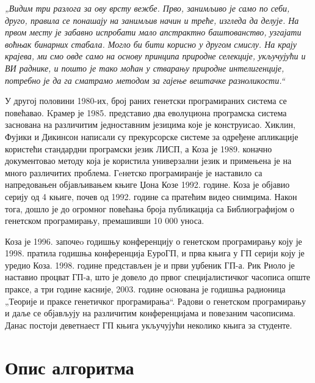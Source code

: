 \documentclass[a4paper]{article}
\begin{document}
\textit{„Видим три разлога за ову врсту вежбе. Прво, занимљиво је само по себи,  друго, правила се понашају на занимљив начин и треће, изгледа да делује. На првом месту је забавно испробати мало апстрактно баштованство, узгајати воћњак бинарних стабала. Могло би бити корисно у другом смислу. На крају крајева, ми смо овде само на основу принципа природне селекције, укључујући и ВИ раднике, и пошто је тако моћан у стварању природне интелигенције, потребно је да га сматрамо методом за гајење вештачке разноликости.“}


У другој половини 1980-их, број раних генетски програмираних система се повећавао. Kрамер је 1985. представио два еволуциона програмска система заснована на различитим једноставним језицима које је конструисао. Хиклин, Фујики и Дикинсон написали су прекурсорске системе за одређене апликације користећи стандардни програмски језик ЛИСП, а Коза је 1989. коначно документовао методу која је користила универзални језик и примењена је на много различитих проблема. Гeнетско програмиранје је наставило са напредовањен објављивањем књиге Џона Козе 1992. године. Коза је објавио серију од 4 књиге, почев од 1992. године са пратећим видео снимцима. Након тога, дошло је до огромног повећања броја публикација са Библиографијом о генетском програмирању, премашивши 10 000 уноса.


Коза је 1996. започеo годишњу конференцију о генетском програмирању  коју је 1998. пратила годишња конференција ЕуроГП, и прва књига у ГП серији коју је уредио Коза. 1998. године представљен је и први уџбеник ГП-а. Рик Риоло је наставио процват ГП-а, што је довело до првог специјалистичког часописа опште праксе, а три године касније, 2003. године основана је годишња радионица „Теорије и праксе генетичког програмирања“. Радови о генетском програмирању и даље се објављују на различитим конференцијама и повезаним часописима. Данас постоји деветнаест ГП књига укључујући неколико књига за студенте.

\section{Опис алгоритма}
\end{document}
